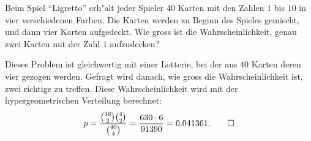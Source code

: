 Beim Spiel ``Ligretto'' erh"alt jeder Spieler 40 Karten mit den
Zahlen $1$ bis $10$ in vier verschiedenen Farben. Die Karten werden
zu Beginn des Spieles gemischt, und dann vier Karten aufgedeckt.
Wie gross ist die Wahrscheinlichkeit, genau zwei Karten mit der
Zahl $1$ aufzudecken?

\begin{loesung}
Dieses Problem ist gleichwertig mit einer Lotterie, bei der
aus 40 Karten deren vier gezogen werden. Gefragt wird danach,
wie gross die Wahrscheinlichkeit ist, zwei richtige zu treffen.
Diese Wahrscheinlichkeit wird mit der hypergeometrischen Verteilung
berechnet:
\[
p=\frac{\binom{36}{2}\binom{4}{2}}{\binom{40}{4}}
=\frac{630\cdot 6}{91390}=0.041361.
\qedhere
\]
\end{loesung}


